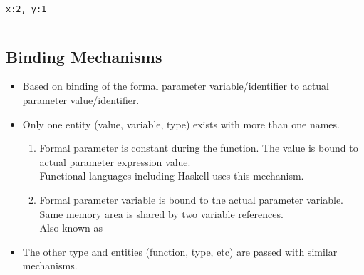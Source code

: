\begin{frame}
\begin{columns}
\begin{column}{.45\linewidth}
{ \ \\
\texttt{x:2, y:1}\\}
\end{column}
\end{columns}
\end{frame}

\subsection{Binding Mechanisms}
\begin{frame}
 \begin{itemize}
  \item  Based on binding of the formal parameter variable/identifier to actual parameter
value/identifier.
  \item Only one entity (value, variable, type) exists with more than one names.
\begin{enumerate}
  \item {} Formal parameter is constant during the function. The
value is bound to actual parameter expression value. \\
  Functional languages including Haskell uses this mechanism.
  \item {} Formal parameter variable is bound to the actual
parameter variable. Same memory area is shared by two variable references.\\
  Also known as  \\
\end{enumerate}
  \item The other type and entities (function, type, etc) are passed with similar mechanisms. 
\end{itemize}
\end{frame}


